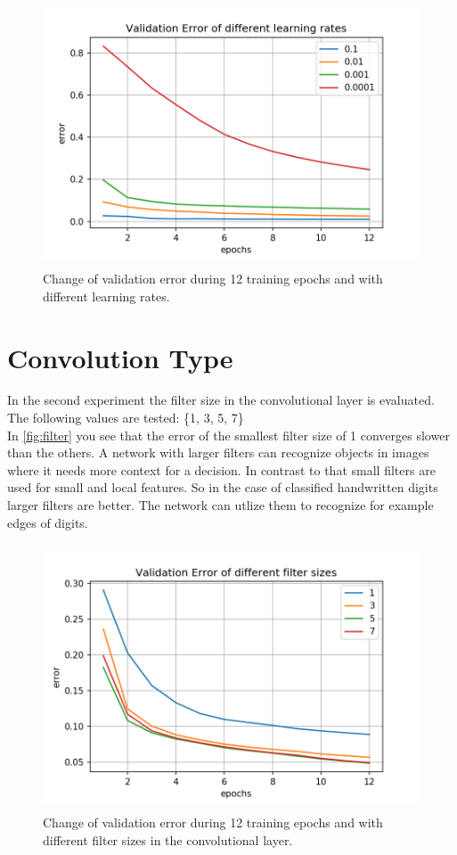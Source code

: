 \documentclass[a4paper,12pt]{article}
\begin{document}
\begin{figure}[H]
	\centering \includegraphics[width=11.70cm, height=7.9cm]{plots/lr/valid_error_12.png}
	\caption{
		\label{fig:lr}
		Change of validation error during 12 training epochs and with different learning rates.
	}
\end{figure}

\section{Convolution Type}\label{filter}

In the second experiment the filter size in the convolutional layer is evaluated. The following values are tested: \{1, 3, 5, 7\}\\
In \autoref{fig:filter} you see that the error of the smallest filter size of 1 converges slower than the others. A network with larger filters can recognize objects in images where it needs more context for a decision. In contrast to that small filters are used for small and local features. So in the case of classified handwritten digits larger filters are better. The network can utlize them to recognize for example edges of digits.


\begin{figure}[H]
  \centering \includegraphics[width=11.70cm, height=7.9cm]{plots/filter/valid_error_12.png}
  \caption{
    \label{fig:filter}
    Change of validation error during 12 training epochs and with different filter sizes in the convolutional layer.
}
\end{figure}
\end{document}

